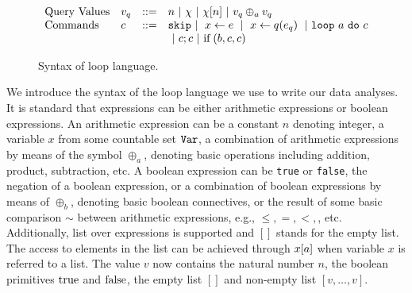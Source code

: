{\begin{figure}
\[\begin{array}{llll}
\mbox{Query Values} & v_q & ::= & n ~|~ \chi ~|~ \chi[n] ~|~ v_q \oplus_a  v_q \\
\mbox{Commands} & c & ::= &  \eskip  ~|~  \assign x \expr ~|~  \assign{x}{ q(\expr_q)}
%
~|~ \eloop ~ \aexpr  ~ \edo ~ c  \\ &&& ~|~ c;c  ~|~ \eif(\bexpr, c, c) 	 
	\\
%
\end{array}
\]
 \caption{Syntax of loop language.}
    \label{fig:syntax_highlevel}
\end{figure}
}
%
We introduce the syntax of the {loop} language we use to write our data analyses.
It is standard that expressions can be either arithmetic expressions or boolean expressions.
An arithmetic expression can be a  constant $n$ denoting integer, a variable $x$ from some countable set $\tt Var$, a combination of arithmetic expressions by means of the symbol $\oplus_a$, denoting basic operations including addition, product, subtraction, etc.
%
A boolean expression can be {\tt true} or {\tt false}, the negation of
a boolean expression, or a combination of boolean expressions by means of $\oplus_b$, denoting basic boolean connectives, or the result of some basic comparison $\sim$ between arithmetic expressions, e.g., $\leq,=,<,$, etc. 
 Additionally, list over expressions is supported and $[]$ stands for the empty list. The access to elements in the list can be achieved through $x[a]$ when variable $x$ is referred to a list. The value $v$ now contains the natural number $n$, the boolean primitives $\mbox{true}$ and $\mbox{false}$,  the empty list $[]$ and non-empty list $[v, \dots, v]$. 
 
% 
%

